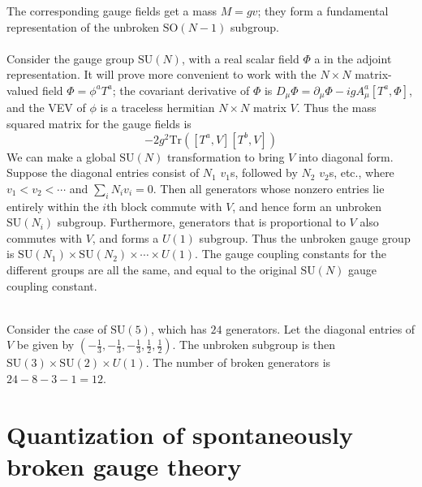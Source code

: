 The corresponding gauge fields get a mass $M = gv$; they form a fundamental representation of the unbroken $\mathrm{SO}(N-1)$ subgroup.
\\ \\
Consider the gauge group $\mathrm{SU}(N)$, with a real scalar field $\Phi$ a in the adjoint representation. It will prove more convenient to work with the $N \times N$ matrix-valued field $\Phi = \phi^a T^a$; the covariant derivative of $\Phi$ is $D_{\mu}\Phi = \partial_{\mu}\Phi - igA^a_{\mu}[T^a,\Phi]$,
and the VEV of $\phi$ is a traceless hermitian $N \times N$ matrix $V$. Thus the mass squared matrix for the gauge fields is
\[-2g^2 \mathrm{Tr}\left([T^a,V][T^b,V]\right)\]
We can make a global $\mathrm{SU}(N)$ transformation to bring $V$ into diagonal form. Suppose the diagonal entries consist of $N_1$ $v_1$s, followed by $N_2$ $v_2$s, etc.,
where $v_1 < v_2 < \cdots$ and $\sum_i N_i v_i = 0$. 
Then all generators whose nonzero entries lie entirely within the $i$th block commute with $V$, and hence form an
unbroken $\mathrm{SU}(N_i)$ subgroup. Furthermore, generators that is proportional to $V$ also commutes with $V$, and forms a
$U(1)$ subgroup. Thus the unbroken gauge group is $\mathrm{SU}(N_1)\times \mathrm{SU}(N_2) \times \cdots \times U(1)$. The gauge coupling constants for the different groups are all the same, and equal to the original $\mathrm{SU}(N)$ gauge coupling constant.
\\ \\
\begin{example}
Consider the case of $\mathrm{SU}(5)$, which has $24$ generators. Let the diagonal entries of $V$ be given by $(-\frac{1}{3},-\frac{1}{3},-\frac{1}{3}, \frac{1}{2}, \frac{1}{2})$. The unbroken subgroup is then $\mathrm{SU}(3) \times \mathrm{SU}(2) \times U(1)$. The number of broken generators is $24 - 8 - 3 - 1 = 12$.
\end{example}

\section{Quantization of spontaneously broken gauge theory}
